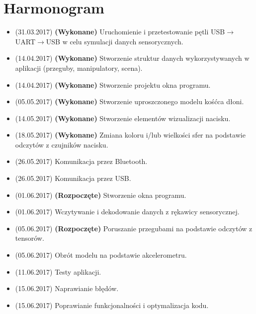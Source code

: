 \documentclass[10pt,a4paper]{article}
\begin{document}
\newpage
\section{Harmonogram}
\begin{itemize}
\item (31.03.2017) \textbf{(Wykonane)} Uruchomienie i przetestowanie pętli USB$\rightarrow $UART$\rightarrow $USB w celu symulacji danych sensorycznych. 
\item (14.04.2017) \textbf{(Wykonane)} Stworzenie struktur danych wykorzystywanych w aplikacji (przeguby, manipulatory, scena).
\item (14.04.2017) \textbf{(Wykonane)} Stworzenie projektu okna programu.
\item (05.05.2017) \textbf{(Wykonane)} Stworzenie uproszczonego modelu kośćca dłoni.
\item (14.05.2017) \textbf{(Wykonane)} Stworzenie elementów wizualizacji nacisku.
\item (18.05.2017) \textbf{(Wykonane)} Zmiana koloru i/lub wielkości sfer na podstawie odczytów z czujników nacisku.
\item (26.05.2017) Komunikacja przez Bluetooth.
\item (26.05.2017) Komunikacja przez USB.
\item (01.06.2017) \textbf{(Rozpoczęte)} Stworzenie okna programu.
\item (01.06.2017) Wczytywanie i dekodowanie danych z rękawicy sensorycznej.
\item (05.06.2017) \textbf{(Rozpoczęte)} Poruszanie przegubami na podstawie odczytów z tensorów.
\item (05.06.2017) Obrót modelu na podstawie akcelerometru.
\item (11.06.2017) Testy aplikacji.
\item (15.06.2017) Naprawianie błędów.
\item (15.06.2017) Poprawianie funkcjonalności i optymalizacja kodu.
\end{itemize}


\end{document}
